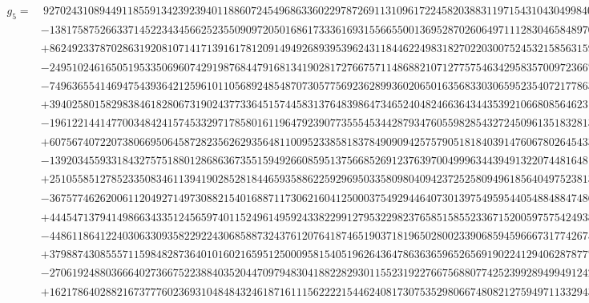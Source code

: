 \documentclass[preprint,12pt,authoryear]{elsarticle}
\begin{document}
{\tiny
\begin{align*}
  g_5=&~9270243108944911855913423923940118860724549686336022978726911310961722458203883119715431043049984039600128x_5^{25}\\
  &-138175875266337145223434566252355090972050168617333616931556655001369528702606497111283046584897048123496192x_5^{24}\\
  &+862492337870286319208107141713916178120914949268939539624311844622498318270220300752453215856315985897987456x_5^{23}\\
  &-2495102461650519533506960742919876844791681341902817276675711486882107127757546342958357009723667467045595840x_5^{22}\\
  &-749636554146947543936421259610110568924854870730577569236289936020650163568330306595235407217786364530222432x_5^{21}\\
  &+39402580158298384618280673190243773364515744583137648398647346524048246636434435392106680856462315406779353056x_5^{20}\\
  &-196122144147700348424157453329717858016119647923907735554534428793476055982854327245096135183281374007838006224x_5^{19}\\
  &+607567407220738066950645872823562629356481100952338581837849090942575790518184039147606780264543360404788805388x_5^{18}\\
  &-1392034559331843275751880128686367355159492660859513756685269123763970049996344394913220744816481337236164688752x_5^{17}\\
  &+2510558512785233508346113941902852818446593588622592969503358098040942372525809496185640497523813014968232095706x_5^{16}\\
  &-3675774626200611204927149730882154016887117306216041250003754929446407301397549595440548848847486181249067607390x_5^{15}\\
  &+4445471379414986634335124565974011524961495924338229912795322982376585158552336715200597575424938671909289449640x_5^{14}\\
  &-4486118641224030633093582292243068588732437612076418746519037181965028002339068594596667317742675531315640964002x_5^{13}\\
  &+3798874308555711598482873640101602165951250009581540519626436478636365965265691902241294062878777541961423998546x_5^{12}\\
  &-2706192488036664027366752238840352044709794830418822829301155231922766756880774252399289499491242862301112642493x_5^{11}\\
  &+1621786402882167377760236931048484324618716111562222154462408173075352980667480821275949711332943322996801085942x_5^{10}\\

\end{align*}}
\end{document}
